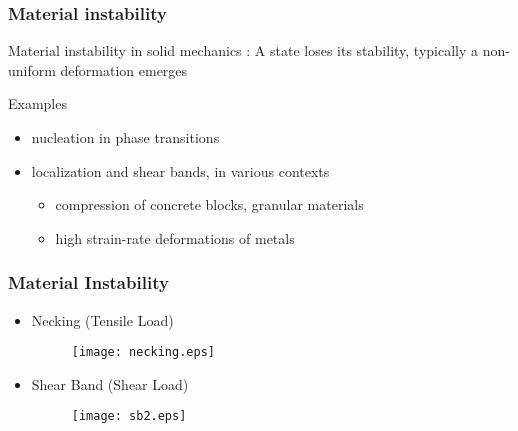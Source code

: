 \documentclass{beamer}
\begin{document}
\begin{frame}\frametitle{Material instability}

Material instability in  solid mechanics :  A state loses its stability, typically a non-uniform deformation emerges

\bigskip

Examples
\begin{itemize}
\item nucleation in phase transitions
\item localization and shear bands, in various contexts
\begin{itemize}
\item[] compression of concrete blocks, granular materials
\item[] high strain-rate deformations of metals
\end{itemize}
\end{itemize}

\end{frame}

\begin{frame}
 \frametitle{Material Instability}
 \begin{itemize}
  \item Necking (Tensile Load)
   \begin{figure}
    \centering
      \texttt{[image: necking.eps]} 
    \end{figure} 
  \item Shear Band (Shear Load)
     \begin{figure}
    \centering
      \texttt{[image: sb2.eps]} 
    \end{figure} 
 \end{itemize}
 \vfill
\end{frame}
\end{document}
